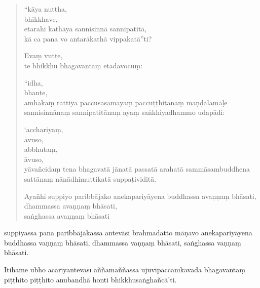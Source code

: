 \documentclass[11pt,twoside,openright]{book}
\begin{document}
\begin{verse}
“kāya nuttha,\\
\vin  bhikkhave,\\
\vin  etarahi kathāya sannisinnā sannipatitā,\\
\vin  kā ca pana vo antarākathā vippakatā”ti?

Evaṃ vutte,\\
\vin  te bhikkhū bhagavantaṃ etadavocuṃ:

“idha,\\
\vin  bhante,\\
\vin  amhākaṃ rattiyā paccūsasamayaṃ paccuṭṭhitānaṃ maṇḍalamāḷe sannisinnānaṃ sannipatitānaṃ ayaṃ saṅkhiyadhammo udapādi:

‘acchariyaṃ,\\
\vin  āvuso,\\
\vin  abbhutaṃ,\\
\vin  āvuso,\\
\vin  yāvañcidaṃ tena bhagavatā jānatā passatā arahatā sammāsambuddhena sattānaṃ nānādhimuttikatā suppaṭividitā.

Ayañhi suppiyo paribbājako anekapariyāyena buddhassa avaṇṇaṃ bhāsati,\\
\vin  dhammassa avaṇṇaṃ bhāsati,\\
\vin  saṅghassa avaṇṇaṃ bhāsati\\


\end{verse}
\pstart
suppiyassa pana paribbājakassa antevāsī brahmadatto māṇavo anekapariyāyena buddhassa vaṇṇaṃ bhāsati, dhammassa vaṇṇaṃ bhāsati, saṅghassa vaṇṇaṃ bhāsati.
\pend

\pstart
Itihame ubho ācariyantevāsī aññamaññassa ujuvipaccanīkavādā bhagavantaṃ piṭṭhito piṭṭhito anubandhā honti bhikkhusaṅghañcā’ti.
\pend
\end{document}
